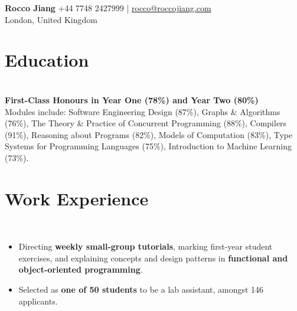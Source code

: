 \documentclass[10pt]{article}
\begin{document}
\textbf{\Huge Rocco Jiang} \hfill +44 7748 2427999 | \href{mailto:rocco@roccojiang.com}{rocco@roccojiang.com} \\
London, United Kingdom \hfill {}  


\section{Education}
 \\
\textbf{First-Class Honours in Year One (78\%) and Year Two (80\%)} \\
Modules include:
Software Engineering Design (87\%),
Graphs \& Algorithms (76\%),
The Theory \& Practice of Concurrent Programming (88\%),
Compilers (91\%),
Reasoning about Programs (82\%),
Models of Computation (83\%),
Type Systems for Programming Languages (75\%),
Introduction to Machine Learning (73\%).

\section{Work Experience}

 \\
\begin{itemize}
  \item Directing \textbf{weekly small-group tutorials}, marking first-year student exercises, and explaining concepts and design patterns in \textbf{functional and object-oriented programming}.
  \item Selected as \textbf{one of 50 students} to be a lab assistant, amongst 146 applicants.
\end{itemize}
\end{document}
